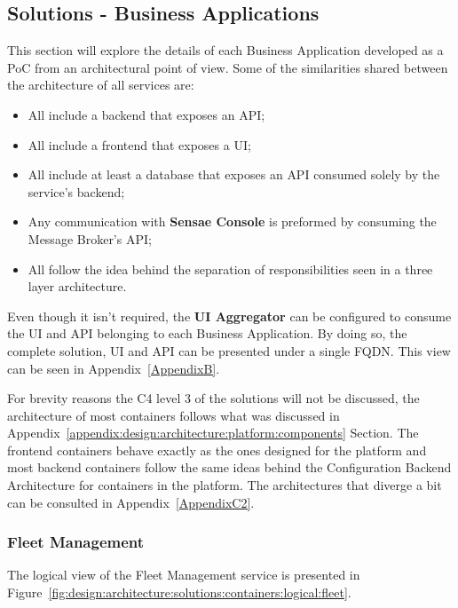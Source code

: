 \subsection{Solutions - Business Applications}
\label{subsec:design:architecture:solutions}

This section will explore the details of each Business Application developed as a \gls{PoC} from an architectural point of view.
Some of the similarities shared between the architecture of all services are:

\begin{itemize}
   \item All include a backend that exposes an \gls{API};
   \item All include a frontend that exposes a \gls{UI};
   \item All include at least a database that exposes an \gls{API} consumed solely by the service's backend;
   \item Any communication with \textbf{Sensae Console} is preformed by consuming the Message Broker's \gls{API};
   \item All follow the idea behind the separation of responsibilities seen in a three layer architecture.
\end{itemize}

Even though it isn't required, the \textbf{UI Aggregator} can be configured to consume the \gls{UI} and \gls{API} belonging to each Business Application. By doing so, the complete solution, \gls{UI} and \gls{API} can be presented under a single \gls{FQDN}. This view can be seen in Appendix~\ref{AppendixB}.

For brevity reasons the C4 level 3 of the solutions will not be discussed, the architecture of most containers follows what was discussed in Appendix~\ref{appendix:design:architecture:platform:components} Section. The frontend containers behave exactly as the ones designed for the platform and most backend containers follow the same ideas behind the Configuration Backend Architecture for containers in the platform. The architectures that diverge a bit can be consulted in Appendix~\ref{AppendixC2}.

\subsubsection{Fleet Management}
\label{subsubsec:design:architecture:solutions:fleet}

The logical view of the Fleet Management service is presented in Figure~\ref{fig:design:architecture:solutions:containers:logical:fleet}.

